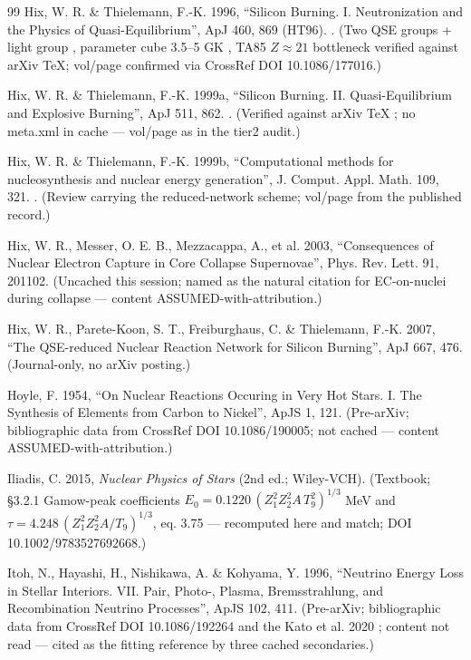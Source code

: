 \begin{thebibliography}{99}
Hix, W. R. \& Thielemann, F.-K. 1996, ``Silicon Burning. I. Neutronization and the Physics of Quasi-Equilibrium'', ApJ 460, 869 (HT96). . (Two QSE groups + light group , parameter cube 3.5--5 GK , TA85 $Z \approx 21$ bottleneck  verified against arXiv TeX; vol/page confirmed via CrossRef DOI 10.1086/177016.)

Hix, W. R. \& Thielemann, F.-K. 1999a, ``Silicon Burning. II. Quasi-Equilibrium and Explosive Burning'', ApJ 511, 862. . (Verified against arXiv TeX ; no meta.xml in cache --- vol/page as in the tier2 audit.)

Hix, W. R. \& Thielemann, F.-K. 1999b, ``Computational methods for nucleosynthesis and nuclear energy generation'', J. Comput. Appl. Math. 109, 321. . (Review carrying the reduced-network scheme; vol/page from the published record.)

Hix, W. R., Messer, O. E. B., Mezzacappa, A., et al. 2003, ``Consequences of Nuclear Electron Capture in Core Collapse Supernovae'', Phys. Rev. Lett. 91, 201102. (Uncached this session; named as the natural citation for EC-on-nuclei during collapse --- content ASSUMED-with-attribution.)

Hix, W. R., Parete-Koon, S. T., Freiburghaus, C. \& Thielemann, F.-K. 2007, ``The QSE-reduced Nuclear Reaction Network for Silicon Burning'', ApJ 667, 476. (Journal-only, no arXiv posting.)

Hoyle, F. 1954, ``On Nuclear Reactions Occuring in Very Hot Stars. I. The Synthesis of Elements from Carbon to Nickel'', ApJS 1, 121. (Pre-arXiv; bibliographic data from CrossRef DOI 10.1086/190005; not cached --- content ASSUMED-with-attribution.)

Iliadis, C. 2015, \emph{Nuclear Physics of Stars} (2nd ed.; Wiley-VCH). (Textbook; \S 3.2.1 Gamow-peak coefficients $E_0 = 0.1220\,(Z_1^2 Z_2^2 A\,T_9^2)^{1/3}$ MeV and $\tau = 4.248\,(Z_1^2 Z_2^2 A/T_9)^{1/3}$, eq. 3.75 --- recomputed here and match; DOI 10.1002/9783527692668.)

Itoh, N., Hayashi, H., Nishikawa, A. \& Kohyama, Y. 1996, ``Neutrino Energy Loss in Stellar Interiors. VII. Pair, Photo-, Plasma, Bremsstrahlung, and Recombination Neutrino Processes'', ApJS 102, 411. (Pre-arXiv; bibliographic data from CrossRef DOI 10.1086/192264 and the Kato et al. 2020 ; content not read --- cited as the fitting reference by three cached secondaries.)


\end{thebibliography}
